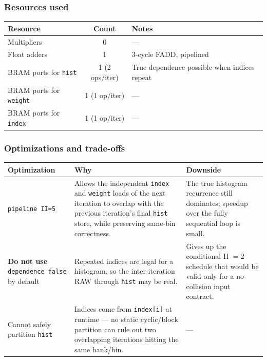 \documentclass[11pt,a4paper]{article}
\begin{document}
\subsubsection*{Resources used}

\begin{center}
\begin{tabular}{lcl}
\toprule
Resource & Count & Notes \\
\midrule
Multipliers              & 0 & --- \\
Float adders             & 1 & 3-cycle FADD, pipelined \\
BRAM ports for \texttt{hist}   & 1 (2 ops/iter) & True dependence possible when indices repeat \\
BRAM ports for \texttt{weight} & 1 (1 op/iter)  & --- \\
BRAM ports for \texttt{index}  & 1 (1 op/iter)  & --- \\
\bottomrule
\end{tabular}
\end{center}

\subsubsection*{Optimizations and trade-offs}

\begin{center}
\begin{tabular}{p{3.2cm} p{6cm} p{5cm}}
\toprule
Optimization & Why & Downside \\
\midrule
\texttt{pipeline II=5} & Allows the independent \texttt{index} and \texttt{weight} loads of the next iteration to overlap with the previous iteration's final \texttt{hist} store, while preserving same-bin correctness. & The true histogram recurrence still dominates; speedup over the fully sequential loop is small. \\
\addlinespace
\textbf{Do not use} \texttt{dependence false} by default & Repeated indices are legal for a histogram, so the inter-iteration RAW through \texttt{hist} may be real. & Gives up the conditional II $=2$ schedule that would be valid only for a no-collision input contract. \\
\addlinespace
Cannot safely partition \texttt{hist} & Indices come from \texttt{index[i]} at runtime --- no static cyclic/block partition can rule out two overlapping iterations hitting the same bank/bin. & --- \\
\bottomrule
\end{tabular}
\end{center}
\end{document}
